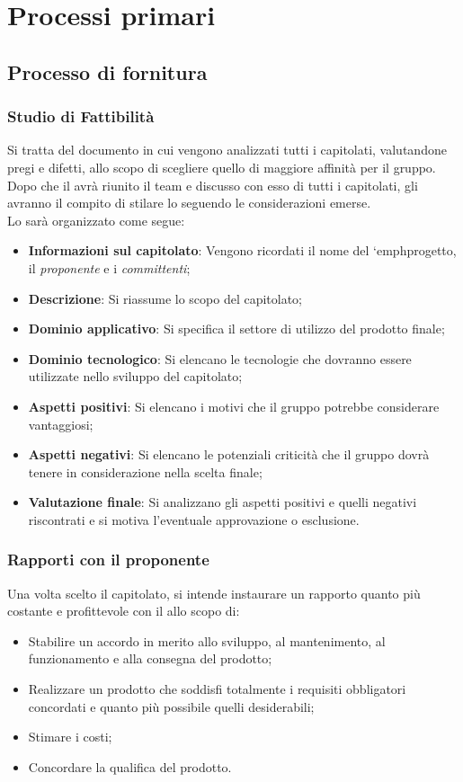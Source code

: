\section{Processi primari}
\subsection{Processo di fornitura}

\subsubsection{Studio di Fattibilità}
Si tratta del documento in cui vengono analizzati tutti i capitolati, valutandone pregi e difetti, allo scopo di scegliere quello di maggiore affinità per il gruppo.
Dopo che il \RdP{} avrà riunito il team e discusso con esso di tutti i capitolati, gli \anas{} avranno il compito di stilare lo \SdF{} seguendo le considerazioni emerse.\\
Lo \SdF{} sarà organizzato come segue:
\begin{itemize}
	\item \textbf{Informazioni sul capitolato}:
	Vengono ricordati il nome del `emph{progetto}, il \textit{proponente} e i \textit{committenti};
	\item \textbf{Descrizione}:
	Si riassume lo scopo del capitolato;
	\item \textbf{Dominio applicativo}:
	Si specifica il settore di utilizzo del prodotto finale;
	\item \textbf{Dominio tecnologico}:
	Si elencano le tecnologie che dovranno essere utilizzate nello sviluppo del capitolato;
	\item \textbf{Aspetti positivi}:
	Si elencano i motivi che il gruppo potrebbe considerare vantaggiosi;
	\item \textbf{Aspetti negativi}:
	Si elencano le potenziali criticità che il gruppo dovrà tenere in considerazione nella scelta finale;
	\item \textbf{Valutazione finale}:
	Si analizzano gli aspetti positivi e quelli negativi riscontrati e si motiva l'eventuale approvazione o esclusione.
\end{itemize}

\subsubsection{Rapporti con il proponente}
Una volta scelto il capitolato, si intende instaurare un rapporto quanto più costante e profittevole con il \proponente{} allo scopo di:
\begin{itemize}
	\item Stabilire un accordo in merito allo sviluppo, al mantenimento, al funzionamento e alla consegna del prodotto;
	\item Realizzare un prodotto che soddisfi totalmente i requisiti obbligatori concordati e quanto più possibile quelli desiderabili;
	\item Stimare i costi;
	\item Concordare la qualifica del prodotto.
\end{itemize}

